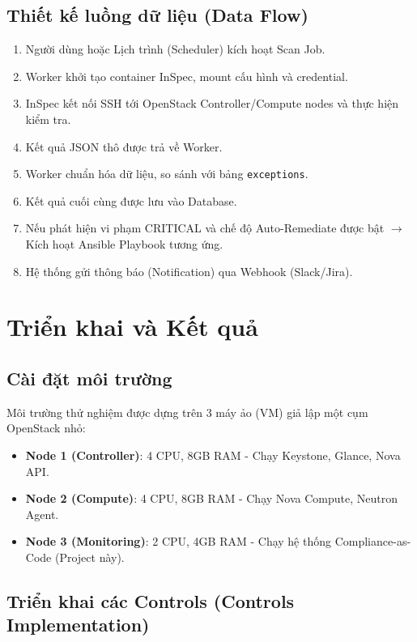 \documentclass[12pt,a4paper]{report}
\begin{document}
\section{Thiết kế luồng dữ liệu (Data Flow)}
\begin{enumerate}
    \item Người dùng hoặc Lịch trình (Scheduler) kích hoạt Scan Job.
    \item Worker khởi tạo container InSpec, mount cấu hình và credential.
    \item InSpec kết nối SSH tới OpenStack Controller/Compute nodes và thực hiện kiểm tra.
    \item Kết quả JSON thô được trả về Worker.
    \item Worker chuẩn hóa dữ liệu, so sánh với bảng \texttt{exceptions}.
    \item Kết quả cuối cùng được lưu vào Database.
    \item Nếu phát hiện vi phạm CRITICAL và chế độ Auto-Remediate được bật $\rightarrow$ Kích hoạt Ansible Playbook tương ứng.
    \item Hệ thống gửi thông báo (Notification) qua Webhook (Slack/Jira).
\end{enumerate}

\chapter{Triển khai và Kết quả}

\section{Cài đặt môi trường}
Môi trường thử nghiệm được dựng trên 3 máy ảo (VM) giả lập một cụm OpenStack nhỏ:
\begin{itemize}
    \item \textbf{Node 1 (Controller)}: 4 CPU, 8GB RAM - Chạy Keystone, Glance, Nova API.
    \item \textbf{Node 2 (Compute)}: 4 CPU, 8GB RAM - Chạy Nova Compute, Neutron Agent.
    \item \textbf{Node 3 (Monitoring)}: 2 CPU, 4GB RAM - Chạy hệ thống Compliance-as-Code (Project này).
\end{itemize}

\section{Triển khai các Controls (Controls Implementation)}
\end{document}
